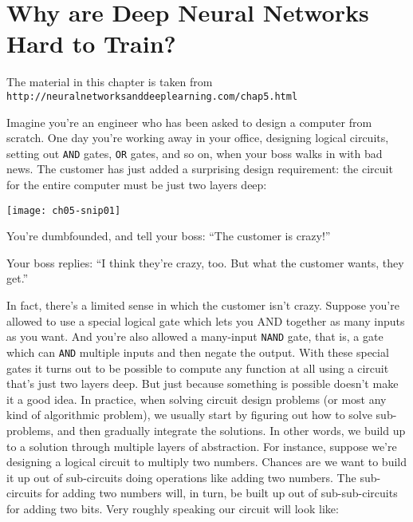\chapter{Why are Deep Neural Networks Hard to Train?}
\label{sec:WhyAreDeepNeuralNetworksHardToTrain}

The material in this chapter is taken from\\
\lstinline{http://neuralnetworksanddeeplearning.com/chap5.html}

Imagine you're an engineer who has been asked to design a computer from scratch. One day you're working away in your office, designing logical circuits, setting out \lstinline{AND} gates, \lstinline{OR} gates, and so on, when your boss walks in with bad news. The customer has just added a surprising design requirement: the circuit for the entire computer must be just two layers deep:


\begin{figure*}[tph]
    \texttt{[image: ch05-snip01]}
    \label{fig:ch05-snip01}
    \end{figure*}

You're dumbfounded, and tell your boss: ``The customer is crazy!''

Your boss replies: ``I think they're crazy, too. But what the customer wants, they get.''

In fact, there's a limited sense in which the customer isn't crazy. Suppose you're allowed to use a special logical gate which lets you AND together as many inputs as you want. And you're also allowed a many-input \lstinline{NAND} gate, that is, a gate which can \lstinline{AND} multiple inputs and then negate the output. With these special gates it turns out to be possible to compute any function at all using a circuit that's just two layers deep.
But just because something is possible doesn't make it a good idea. In practice, when solving circuit design problems (or most any kind of algorithmic problem), we usually start by figuring out how to solve sub-problems, and then gradually integrate the solutions. In other words, we build up to a solution through multiple layers of abstraction. 
For instance, suppose we're designing a logical circuit to multiply two numbers. Chances are we want to build it up out of sub-circuits doing operations like adding two numbers. The sub-circuits for adding two numbers will, in turn, be built up out of sub-sub-circuits for adding two bits. Very roughly speaking our circuit will look like:

